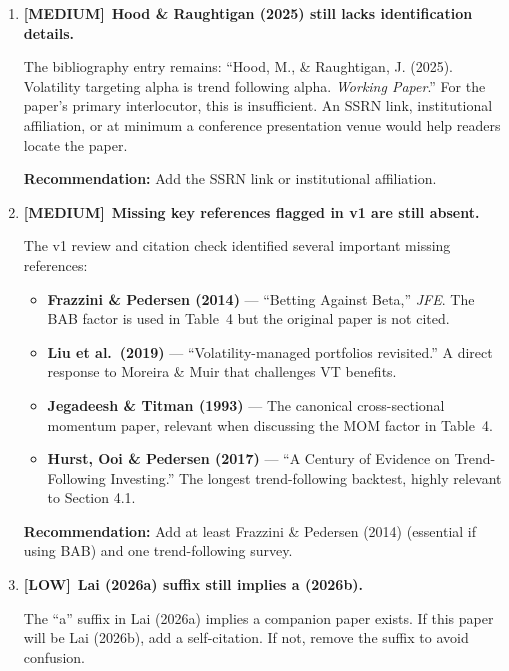 \documentclass[12pt,a4paper]{article}
\newcommand{\MEDIUM}{\textcolor{medsev}{\textbf{[MEDIUM]}}}
\newcommand{\LOW}{\textcolor{lowsev}{\textbf{[LOW]}}}
\begin{document}
\begin{enumerate}[label=\textbf{E.\arabic*}]

\item \MEDIUM\ \textbf{Hood \& Raughtigan (2025) still lacks identification details.}

The bibliography entry remains: ``Hood, M., \& Raughtigan, J. (2025). Volatility targeting alpha is trend following alpha. \textit{Working Paper}.'' For the paper's primary interlocutor, this is insufficient. An SSRN link, institutional affiliation, or at minimum a conference presentation venue would help readers locate the paper.

\textbf{Recommendation:} Add the SSRN link or institutional affiliation.


\item \MEDIUM\ \textbf{Missing key references flagged in v1 are still absent.}

The v1 review and citation check identified several important missing references:
\begin{itemize}
\item \textbf{Frazzini \& Pedersen (2014)} --- ``Betting Against Beta,'' \textit{JFE}. The BAB factor is used in Table~4 but the original paper is not cited.
\item \textbf{Liu et al.\ (2019)} --- ``Volatility-managed portfolios revisited.'' A direct response to Moreira \& Muir that challenges VT benefits.
\item \textbf{Jegadeesh \& Titman (1993)} --- The canonical cross-sectional momentum paper, relevant when discussing the MOM factor in Table~4.
\item \textbf{Hurst, Ooi \& Pedersen (2017)} --- ``A Century of Evidence on Trend-Following Investing.'' The longest trend-following backtest, highly relevant to Section 4.1.
\end{itemize}

\textbf{Recommendation:} Add at least Frazzini \& Pedersen (2014) (essential if using BAB) and one trend-following survey.


\item \LOW\ \textbf{Lai (2026a) suffix still implies a (2026b).}

The ``a'' suffix in Lai (2026a) implies a companion paper exists. If this paper will be Lai (2026b), add a self-citation. If not, remove the suffix to avoid confusion.

\end{enumerate}


\end{document}
